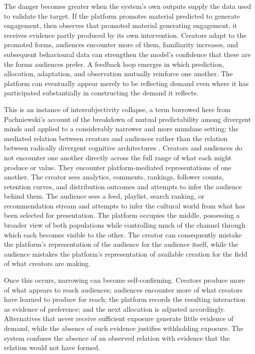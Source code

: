 \documentclass[11pt]{article}
\begin{document}
The danger becomes greater when the system's own outputs supply the data used to validate the target. If the platform promotes material predicted to generate engagement, then observes that promoted material generating engagement, it receives evidence partly produced by its own intervention. Creators adapt to the promoted forms, audiences encounter more of them, familiarity increases, and subsequent behavioural data can strengthen the model's confidence that these are the forms audiences prefer. A feedback loop emerges in which prediction, allocation, adaptation, and observation mutually reinforce one another. The platform can eventually appear merely to be reflecting demand even where it has participated substantially in constructing the demand it reflects.

This is an instance of intersubjectivity collapse, a term borrowed here from Pachniewski's account of the breakdown of mutual predictability among divergent minds and applied to a considerably narrower and more mundane setting: the mediated relation between creators and audiences rather than the relation between radically divergent cognitive architectures \parencite{pachniewski2023intersubjectivity}. Creators and audiences do not encounter one another directly across the full range of what each might produce or value. They encounter platform-mediated representations of one another. The creator sees analytics, comments, rankings, follower counts, retention curves, and distribution outcomes and attempts to infer the audience behind them. The audience sees a feed, playlist, search ranking, or recommendation stream and attempts to infer the cultural world from what has been selected for presentation. The platform occupies the middle, possessing a broader view of both populations while controlling much of the channel through which each becomes visible to the other. The creator can consequently mistake the platform's representation of the audience for the audience itself, while the audience mistakes the platform's representation of available creation for the field of what creators are making.

Once this occurs, narrowing can become self-confirming. Creators produce more of what appears to reach audiences; audiences encounter more of what creators have learned to produce for reach; the platform records the resulting interaction as evidence of preference; and the next allocation is adjusted accordingly. Alternatives that never receive sufficient exposure generate little evidence of demand, while the absence of such evidence justifies withholding exposure. The system confuses the absence of an observed relation with evidence that the relation would not have formed.
\end{document}
